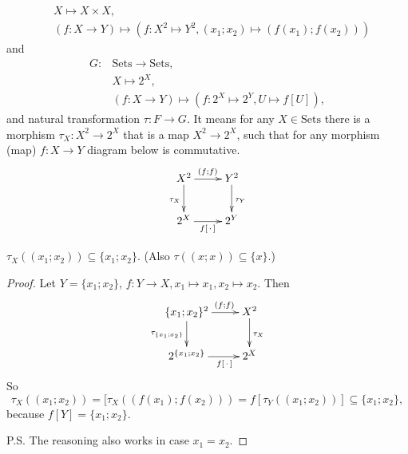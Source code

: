 \documentclass[12pt,a4paper]{article}
\newcommand{\Sets}{\mathrm{Sets}}
\begin{document}
\begin{problem}{16}
\begin{enumerate}
\begin{align*}
                    &X \mapsto X \times X,\\
                    &(f: X \to Y) \mapsto (f: X^2 \mapsto Y^2, (x_1; x_2) \mapsto (f(x_1); f(x_2)))
                \end{align*}
                and
                \begin{align*}
                    G: {}
                    &\Sets \to \Sets,\\
                    &X \mapsto 2^X,\\
                    &(f: X \to Y) \mapsto (f: 2^X \mapsto 2^Y, U \mapsto f[U]),
                \end{align*}
                and natural transformation $\tau: F \to G$. It means for any $X \in \Sets$ there is a morphism $\tau_X: X^2 \to 2^X$ that is a map $X^2 \to 2^X$, such that for any morphism (map) $f: X \to Y$ diagram below is commutative.
                \[
                    \xymatrix{
                        X^2 \ar[r]^{(f; f)} \ar[d]_{\tau_X} & Y^2 \ar[d]^{\tau_Y}\\
                        2^X \ar[r]_{f[\,\cdot\,]} & 2^Y
                    }
                \]

                \begin{lemma}
                    $\tau_X((x_1; x_2)) \subseteq \{x_1; x_2\}$. (Also $\tau((x; x)) \subseteq \{x\}$.)
                \end{lemma}

                \begin{proof}
                    Let $Y = \{x_1; x_2\}$, $f: Y \to X, x_1 \mapsto x_1, x_2 \mapsto x_2$. Then
                    \[
                        \xymatrix{
                            \{x_1; x_2\}^2 \ar[r]^(0.6){(f; f)} \ar[d]_{\tau_{\{x_1; x_2\}}} & X^2 \ar[d]^{\tau_X}\\
                            2^{\{x_1; x_2\}} \ar[r]_(0.6){f[\,\cdot\,]} & 2^X
                        }
                    \]
                    So
                    \[\tau_X((x_1; x_2)) = [\tau_X((f(x_1); f(x_2))) = f[\tau_Y((x_1; x_2))] \subseteq \{x_1; x_2\},\]
                    because $f[Y] = \{x_1; x_2\}$.

                    P.S. The reasoning also works in case $x_1 = x_2$.
                \end{proof}


\end{enumerate}
\end{problem}
\end{document}
